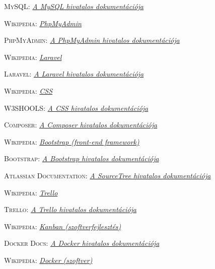 \documentclass[
]{thesis-ekf}
\theoremstyle{definition}
\theoremstyle{remark}
\begin{document}
\begin{thebibliography}{2}
\textsc{MySQL}: \href{https://dev.mysql.com/doc/}
{
	\emph{A MySQL hivatalos dokumentációja}
}

\textsc{Wikipedia}: \href{https://hu.wikipedia.org/wiki/PhpMyAdmin}
{
	\emph{PhpMyAdmin}
}

\textsc{PhpMyAdmin}: \href{https://www.phpmyadmin.net/docs/}
{
	\emph{A PhpMyAdmin hivatalos dokumentációja}
}

\textsc{Wikipedia}: \href{https://en.wikipedia.org/wiki/Laravel}
{
	\emph{Laravel}
}

\textsc{Laravel}: \href{https://laravel.com/docs/10.x}
{
	\emph{A Laravel hivatalos dokumentációja}
}

\textsc{Wikipedia}: \href{https://hu.wikipedia.org/wiki/CSS}
{
	\emph{CSS}
}

\textsc{W3SHOOLS}: \href{https://www.w3schools.com/css/default.asp}
{
	\emph{A CSS hivatalos dokumentációja}
}

\textsc{Composer}: \href{https://getcomposer.org/doc/}
{
	\emph{A Composer hivatalos dokumentációja}
}

\textsc{Wikipedia}: \href{https://en.wikipedia.org/wiki/Bootstrap_(front-end_framework)}
{
	\emph{Bootstrap (front-end framework)}
}

\textsc{Bootstrap}: \href{https://getbootstrap.com/docs/5.3/getting-started/introduction/}
{
	\emph{A Bootstrap hivatalos dokumentációja}
}

\textsc{Atlassian Documentation}: \href{https://confluence.atlassian.com/get-started-with-sourcetree}
{
	\emph{A SourceTree hivatalos dokumentációja}
}

\textsc{Wikipedia}: \href{https://hu.wikipedia.org/wiki/Trello}
{
	\emph{Trello}
}

\textsc{Trello}: \href{https://trello.com/guide}
{
	\emph{A Trello hivatalos dokumentációja}
}

\textsc{Wikipedia}: \href{https://hu.wikipedia.org/wiki/Kanban_(szoftverfejleszt%C3%A9s)}
{
	\emph{Kanban (szoftverfejlesztés)}
}

\textsc{Docker Docs}: \href{https://docs.docker.com/}
{
	\emph{A Docker hivatalos dokumentációja}
}

\textsc{Wikipedia}: \href{https://hu.wikipedia.org/wiki/Docker_(szoftver)}
{
	\emph{Docker (szoftver)}
}


\end{thebibliography}
\end{document}
